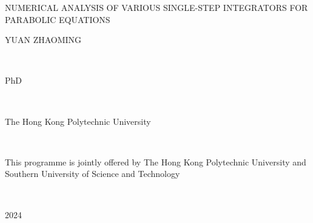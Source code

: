 \thispagestyle{empty}
\begin{center}
\huge

\vspace{3cm}

NUMERICAL ANALYSIS OF VARIOUS SINGLE-STEP INTEGRATORS FOR PARABOLIC EQUATIONS


\vskip25pt

YUAN ZHAOMING

~

PhD

~

The Hong Kong Polytechnic University

~

This programme is jointly offered by The Hong Kong Polytechnic University and Southern University of Science and Technology

~

2024



\end{center}